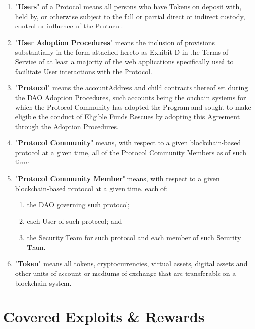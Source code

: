 \documentclass{article}
\begin{document}
\begin{enumerate}[label=\Alph*.]
    \item "\textbf{Users}" of a Protocol means all persons who have Tokens on deposit with, held by, or otherwise subject to the full or partial direct or indirect custody, control or influence of the Protocol.

    \item "\textbf{User Adoption Procedures}" means the inclusion of provisions substantially in the form attached hereto as Exhibit D in the Terms of Service of at least a majority of the web applications specifically used to facilitate User interactions with the Protocol.

    \item "\textbf{Protocol}" means the accountAddress and child contracts thereof set during the DAO Adoption Procedures, such accounts being the onchain systems for which the Protocol Community has adopted the Program and sought to make eligible the conduct of Eligible Funds Rescues by adopting this Agreement through the Adoption Procedures.

    \item "\textbf{Protocol Community}" means, with respect to a given blockchain-based protocol at a given time, all of the Protocol Community Members as of such time.

    \item "\textbf{Protocol Community Member}" means, with respect to a given blockchain-based protocol at a given time, each of:

          \begin{enumerate}
              \item the DAO governing such protocol;
              \item each User of such protocol; and
              \item the Security Team for such protocol and each member of such Security Team.

          \end{enumerate}

    \item "\textbf{Token}" means all tokens, cryptocurrencies, virtual assets, digital assets and other units of account or mediums of exchange that are transferable on a blockchain system.
\end{enumerate}

\section{Covered Exploits \& Rewards}\label{sec:covered}
\end{document}
